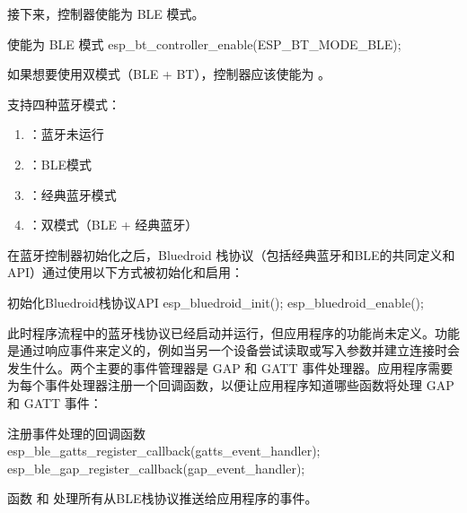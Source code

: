 \documentclass[lang=cn,newtx,10pt,scheme=chinese]{elegantbook}
\begin{document}
接下来，控制器使能为 BLE 模式。

\begin{mycode}{使能为 BLE 模式}
esp_bt_controller_enable(ESP_BT_MODE_BLE);
\end{mycode}

\begin{marker}
如果想要使用双模式（BLE + BT），控制器应该使能为  。
\end{marker}

支持四种蓝牙模式：

\begin{enumerate}
\item {}：蓝牙未运行
\item {}：BLE模式
\item {}：经典蓝牙模式
\item {}：双模式（BLE + 经典蓝牙）
\end{enumerate}

在蓝牙控制器初始化之后，Bluedroid 栈协议（包括经典蓝牙和BLE的共同定义和API）通过使用以下方式被初始化和启用：

\begin{mycode}{初始化Bluedroid栈协议API}
esp_bluedroid_init();
esp_bluedroid_enable();
\end{mycode}

此时程序流程中的蓝牙栈协议已经启动并运行，但应用程序的功能尚未定义。功能是通过响应事件来定义的，例如当另一个设备尝试读取或写入参数并建立连接时会发生什么。两个主要的事件管理器是 GAP 和 GATT 事件处理器。应用程序需要为每个事件处理器注册一个回调函数，以便让应用程序知道哪些函数将处理 GAP 和 GATT 事件：

\begin{mycode}{注册事件处理的回调函数}
esp_ble_gatts_register_callback(gatts_event_handler);
esp_ble_gap_register_callback(gap_event_handler);
\end{mycode}

函数  和  处理所有从BLE栈协议推送给应用程序的事件。
\end{document}
